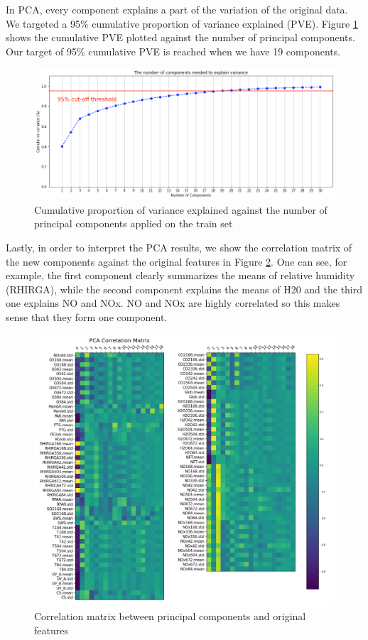 In PCA, every component explains a part of the variation of the original data. We targeted a 95\% cumulative proportion of variance explained (PVE). Figure \ref{fig:pve} shows the cumulative PVE plotted against the number of principal components. Our target of 95\% cumulative PVE is reached when we have 19 components.

\begin{figure}
   \centering
   \includegraphics[width=\textwidth]{images/cumulative_pve.png}
   \caption{Cumulative proportion of variance explained against the number of principal components applied on the train set}
   \label{fig:pve}
\end{figure}

Lastly, in order to interpret the PCA results, we show the correlation matrix of the new components against the original features in Figure \ref{fig:pca_correlation_matrix}. One can see, for example, the first component clearly summarizes the means of relative humidity (RHIRGA), while the second component explains the means of H20 and the third one explains NO and NOx. NO and NOx are highly correlated so this makes sense that they form one component.

\begin{figure}
   \centering
   \includegraphics[width=\textwidth]{images/pca_correlation_matrix.png}
   \caption{Correlation matrix between principal components and original features}
   \label{fig:pca_correlation_matrix}
\end{figure}
